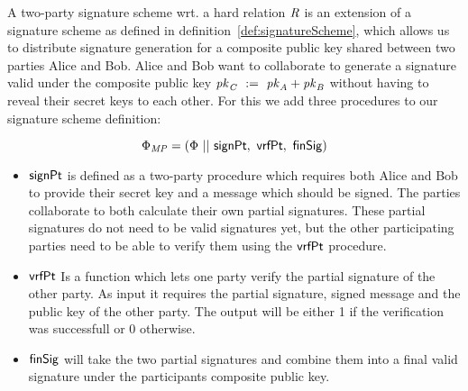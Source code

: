 \begin{definition}
    \label{def:twoPartySig}
    A two-party signature scheme wrt. a hard relation $\mathit{R}$ is an extension of a signature scheme as defined in definition~\ref{def:signatureScheme}, which allows us to distribute signature generation for a composite public key shared between two parties Alice and Bob.
    Alice and Bob want to collaborate to generate a signature valid under the composite public key $\mathit{pk}_{\mathit{C}} ~:=~ \mathit{pk}_{\mathit{A}} + \mathit{pk}_{\mathit{B}}$ without having to reveal their secret keys to each other. For this we add three procedures to our signature scheme definition:

    \[ \Phi_{\mathit{MP}} = (\Phi ~||~ \mathsf{signPt} ,~ \mathsf{vrfPt} ,~ \mathsf{finSig}) \]
    \begin{itemize}
        \item $\mathsf{signPt}$ is defined as a two-party procedure which requires both Alice and Bob to provide their secret key and a message which should be signed. The parties collaborate to both calculate their own partial signatures. These partial signatures do not need to be valid signatures yet, but the other participating parties need to be able to verify them using the $\mathsf{vrfPt}$ procedure.
        \item $\mathsf{vrfPt}$ Is a function which lets one party verify the partial signature of the other party. As input it requires the partial signature, signed message and the public key of the other party. The output will be either 1 if the verification was successfull or 0 otherwise.
        \item $\mathsf{finSig}$ will take the two partial signatures and combine them into a final valid signature under the participants composite public key.
    \end{itemize}
\end{definition}

